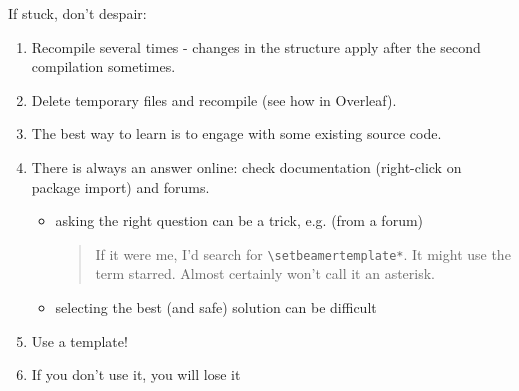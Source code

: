 \documentclass[11pt]{beamer} %
\begin{document}
\begin{frame}{If stuck, don't despair:}	
	\begin{exampleblock}{}
		\begin{enumerate}
			\item Recompile several times - changes in the structure apply after the second compilation sometimes.
			\item Delete temporary files and recompile (see how in Overleaf).
			\item The best way to learn is to engage with some existing source code.
			\item There is always an answer online: check documentation (right-click on package import) and forums.  
			\begin{itemize}
				\item asking the right question can be a trick, e.g. (from a forum)
				\begin{quote}
If it were me, I'd search for \verb|\setbeamertemplate*|. It might use the term starred. Almost certainly won't call it an asterisk.
				\end{quote}
				\item selecting the best (and safe) solution can be difficult
			\end{itemize}
		\item Use a template!
		\item If you don't use it, you will lose it

		\end{enumerate}
	\end{exampleblock}
\end{frame}
\end{document}
